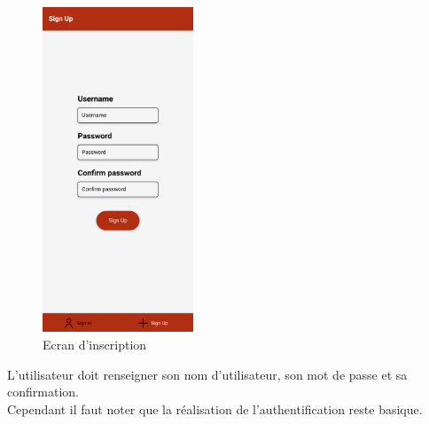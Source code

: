 \documentclass[12pt]{article}
\begin{document}
        \begin{figure}[H]
            \centering
            \includegraphics[width=0.4\textwidth]{images/signUp}
            \caption{Ecran d'inscription}
            \label{fig:insc}
        \end{figure}
        L'utilisateur doit renseigner son nom d'utilisateur, son mot de passe et sa confirmation.\\

        Cependant il faut noter que la réalisation de l'authentification reste basique.
\end{document}
